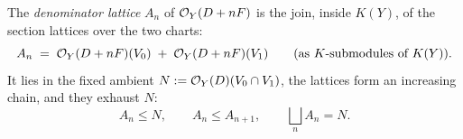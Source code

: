 \begin{definition}
  \label{pa-def:fiberLattice}
  \leanok

  The \emph{denominator lattice} \(A_n\) of \(\mathcal{O}_{Y}(D + nF)\) is the join, inside \(K(Y)\), of the
  section lattices over the two charts:
  \[
    A_n \;=\; \mathcal{O}_{Y}(D + nF)(V_0) \;+\; \mathcal{O}_{Y}(D + nF)(V_1)
    \qquad (\text{as } K\text{-submodules of } K(Y)).
  \]
  It lies in the fixed ambient \(N := \mathcal{O}_{Y}(D)(V_0 \cap V_1)\), the lattices form an increasing
  chain, and they exhaust \(N\):
  \[
    A_n \le N, \qquad A_n \le A_{n+1}, \qquad \bigsqcup_{n} A_n = N .
  \]
\end{definition}
